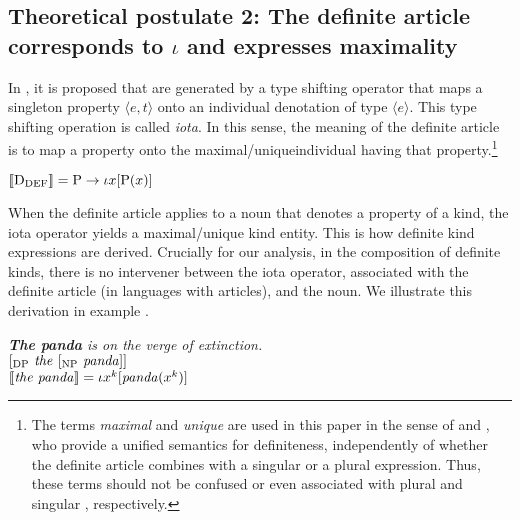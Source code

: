 \documentclass[output=paper
,modfonts
,nonflat]{langsci/langscibook}
\begin{document}
	\subsection[Theoretical postulate 2: The definite article corresponds to ι and expresses maximality]{Theoretical postulate 2: The definite article corresponds to $\iota$ and expresses maximality}\largerpage
	
	In \citet{Partee1987}, it is proposed that  are generated by a type shifting operator that maps a singleton property $\langle e, t\rangle$ onto an individual denotation of type $\langle e\rangle$. This type shifting operation is called \textit{iota}. In this sense, the meaning of the definite article is to map a property onto the maximal/unique\largerpage individual having that property.\footnote{The terms \textit{maximal} and \textit{unique} are used in this paper in the sense of \citet{Sharvy1980} and \citet{Link1983}, who provide a unified semantics for definiteness, independently of whether the definite article combines with a singular or a plural expression. Thus, these terms should not be confused or even associated with plural and singular , respectively.}
	
	\ea \label{ex:borik:6}
	$[\![\mbox{D}_{\mbox{\scriptsize{DEF}}}]\!] = \mbox{P} \rightarrow \iota{x} [\mbox{P}(x)]$
	\z
	
	When the definite article applies to a noun that denotes a property of a kind, the iota operator yields a maximal/unique kind entity. This is how definite kind expressions are derived. Crucially for our analysis, in the composition of definite kinds, there is no intervener between the iota operator, associated with the definite article (in languages with articles), and the noun. We illustrate this derivation in example . 
	
	\ea\label{ex:borik:7}
	\ea\label{ex:borik:7a}
	\textit{\textbf{The panda} is on the verge of extinction.} \\
	\ex\label{ex:borik:7b}
	$[_{\mbox{\scriptsize{DP}}} \mbox{\textit{ the }} [_{\mbox{\scriptsize{NP}}} \mbox{\textit{ panda}} ]]$\\
	\ex\label{ex:borik:7c}
	$[\![\mbox{\textit{the panda}}]\!] = \iota{x^k} [\mbox{\textit{panda}}(x^k)]$
	\z
	\z
	
\end{document}
